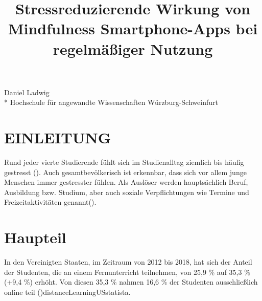 \documentclass[10pt]{article}
\title{Stressreduzierende Wirkung von Mindfulness Smartphone-Apps bei regelmäßiger Nutzung}
\makeatletter
\renewcommand{\maketitle}{\bgroup\setlength{\parindent}{0pt}
\begin{flushleft}
  \Large{\textbf{\@title}}
\end{flushleft}\egroup
}
\newcommand{\zit}[1]{(\cite{#1})}
\makeatother
\begin{document}
\maketitle

\begin{flushleft}
Daniel Ladwig \\* 
Hochschule für angewandte Wissenschaften Würzburg-Schweinfurt
\end{flushleft}



\section{EINLEITUNG}

Rund jeder vierte Studierende fühlt sich im Studienalltag ziemlich bis häufig gestresst \zit{gesundheitStudis2017}. Auch gesamtbevölkerisch ist erkennbar, dass sich vor allem junge Menschen immer gestresster fühlen. Als Auslöser werden hauptsächlich Beruf, Ausbildung bzw. Studium, aber auch soziale Verpflichtungen wie Termine und Freizeitaktivitäten genannt\zit{tkEntspannDich2016}.
\bigbreak


\section{Haupteil}
In den Vereinigten Staaten, im Zeitraum von 2012 bis 2018, hat sich der Anteil der Studenten, die an einem Fernunterricht teilnehmen, von 25,9 \% auf 35,3 \% (+9,4 \%) erhöht. Von diesen 35,3 \% nahmen 16,6 \% der Studenten ausschließlich online teil \zit{distanceLearningUSies}{distanceLearningUSstatista}. \bigbreak


\nocite{*}
\printbibliography
\end{document}
